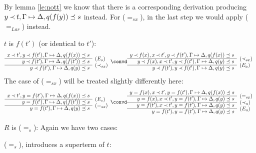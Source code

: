 \begin{PROOF}
\begin{LS}
\begin{LSA}
By lemma \ref{le:nott} we know that there is a corresponding derivation
producing $y\mathbin{\prec} t, \Gamma\mathrel{\mapsto}\Delta, q(f(y))\preceq s$ instead.
For ($=_{sx}$), in the last step we would apply ($=_{Lar}$) instead.
%
\item $t$ is $f(t')$ (or identical to $t'$):
\[ \begin{array}{rl}
  x\Incl t', y\Incl f(t'), \GSD, q(f(x))\preceq s \\ \cline{1-1}
               y\Incl f(t'), \GSD, q(f(t'))\preceq s & \rabove{(E_s)} \\ \cline{1-1}
               y\Incl f(t'), \GSD, q(y)\preceq s & \rabove{(\Incl_{sx})} 
\end{array} \convd
 \begin{array}{rl}
 y\Incl f(x), x\Incl t', y\Incl f(t'), \GSD, q(f(x))\preceq s \\ \cline{1-1}
 y\Incl f(x), x\Incl t', y\Incl f(t'), \GSD, q(y)\preceq s & \rabove{(\Incl_{sx})} \\ \cline{1-1}
 y\Incl f(t'), y\Incl f(t'), \GSD, q(y)\preceq s & \rabove{(E_a)} 
\end{array} \]
The case of ($=_{sx}$) will be treated slightly differently here:
\[ \begin{array}{rl}
  x\Incl t', y= f(t'), \GSD, q(f(x))\preceq s \\ \cline{1-1}
               y= f(t'), \GSD, q(f(t'))\preceq s & \rabove{(E_s)} \\ \cline{1-1}
               y= f(t'), \GSD, q(y)\preceq s & \rabove{(=_{sx})} 
\end{array} \convd
 \begin{array}{rl}
 y= f(x), x\Incl t', y= f(t'), \GSD, q(f(x))\preceq s \\ \cline{1-1}
 y= f(x), x\Incl t', y= f(t'), \GSD, q(y)\preceq s & \rabove{(=_{sx})} \\ \cline{1-1}
 y= f(t'),x\Incl t', y= f(t'), \GSD, q(y)\preceq s & \rabove{(\Incl_a)}  \\ \cline{1-1}
 y= f(t'), y= f(t'), \GSD, q(y)\preceq s & \rabove{(E_a)} 
\end{array} \]
 \end{LSA}
%
\item $R$ is ($=_s$):
Again we have two cases:
 \begin{LSA}
 \item ($=_s$), introduces a superterm of $t$:
\[ \begin{array}{rl}

\end{array}\]
\end{LSA}
\end{LS}
\end{PROOF}
